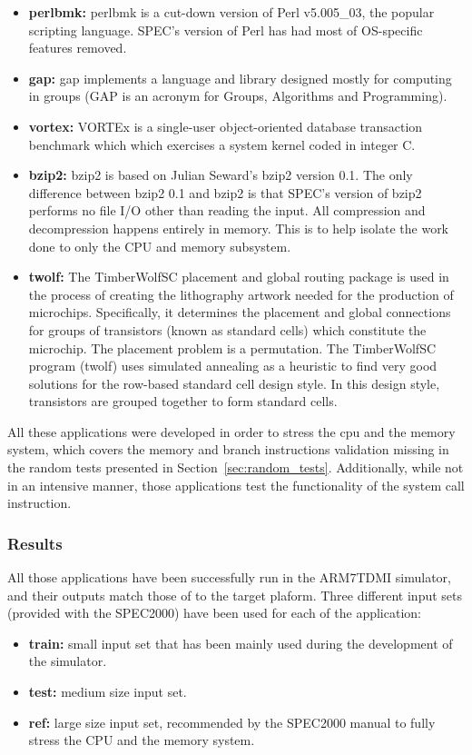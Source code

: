 \begin{itemize}
	\item \textbf{perlbmk:} perlbmk is a cut-down version of Perl v5.005\_03, the popular scripting language. SPEC's version of Perl has had most of OS-specific features removed.
	\item \textbf{gap:} gap implements a language and library designed mostly for computing in groups (GAP is an acronym for Groups, Algorithms and Programming).
	\item \textbf{vortex:} VORTEx is a single-user object-oriented database transaction benchmark  which which exercises a system kernel coded in integer C.
	\item \textbf{bzip2:} bzip2 is based on Julian Seward's bzip2 version 0.1. The only difference between bzip2 0.1 and bzip2 is that SPEC's version of bzip2 performs no file I/O other than reading the input. All compression and decompression happens entirely in memory. This is to help isolate the work done to only the CPU and memory subsystem.
	\item \textbf{twolf:} The TimberWolfSC placement and global routing package is used in the process of creating the lithography artwork needed for the production of microchips. Specifically, it determines the placement and global connections for groups of transistors (known as standard cells) which constitute the microchip. The placement problem is a permutation. The TimberWolfSC program (twolf) uses simulated annealing as a heuristic to find very good solutions for the row-based standard cell design style.  In this design style, transistors are grouped together to form standard cells.
\end{itemize}

All these applications were developed in order to stress the cpu and the memory system, which covers the memory and branch instructions validation missing in the random tests presented in Section~\ref{sec:random_tests}. 
Additionally, while not in an intensive manner, those applications test the functionality of the system call instruction.

\subsubsection{Results}

All those applications have been successfully run in the ARM7TDMI simulator, and their outputs match those of to the target plaform.
Three different input sets (provided with the SPEC2000) have been used for each of the application:
\begin{itemize}
	\item \textbf{train:} small input set that has been mainly used during the development of the simulator.
	\item \textbf{test:} medium size input set.
	\item \textbf{ref:} large size input set, recommended by the SPEC2000 manual to fully stress the CPU and the memory system.
\end{itemize}

